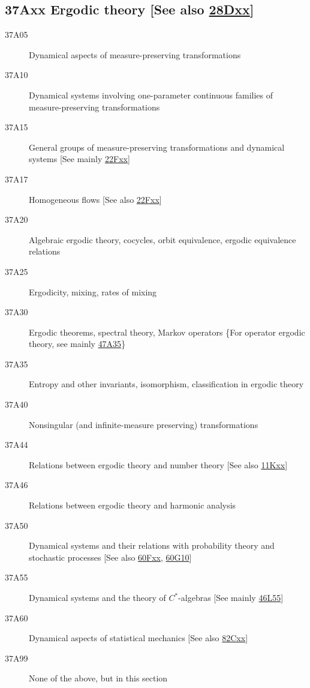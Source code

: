 \documentclass[letterpaper]{article}
\begin{document}
\subsection*{37Axx  Ergodic theory [See also \hyperref[28Dxx]{28Dxx}] }\label{37Axx}
\begin{description}  
\item [37A05]\label{37A05} Dynamical aspects of measure-preserving transformations 
\item [37A10]\label{37A10} Dynamical systems involving one-parameter continuous families of measure-preserving transformations
\item [37A15]\label{37A15} General groups of measure-preserving transformations and dynamical systems [See mainly \hyperref[22Fxx]{22Fxx}]
\item [37A17]\label{37A17} Homogeneous flows [See also \hyperref[22Fxx]{22Fxx}]
\item [37A20]\label{37A20} Algebraic ergodic theory, cocycles, orbit equivalence,  ergodic equivalence relations
\item [37A25]\label{37A25} Ergodicity, mixing, rates of mixing
\item [37A30]\label{37A30} Ergodic theorems, spectral theory, Markov operators \{For operator ergodic theory, see mainly \hyperref[47A35]{47A35}\}
\item [37A35]\label{37A35} Entropy and other invariants, isomorphism, classification in ergodic theory
\item [37A40]\label{37A40} Nonsingular (and infinite-measure preserving) transformations 
\item [37A44]\label{37A44} Relations between ergodic theory and number theory  [See also \hyperref[11Kxx]{11Kxx}]
\item [37A46]\label{37A46} Relations between ergodic theory and harmonic analysis 
\item [37A50]\label{37A50} Dynamical systems and their relations with probability theory and stochastic processes [See also \hyperref[60Fxx]{60Fxx}, \hyperref[60G10]{60G10}]
\item [37A55]\label{37A55}  Dynamical systems and  the theory of $C^*$-algebras [See mainly \hyperref[46L55]{46L55}]
\item [37A60]\label{37A60} Dynamical aspects of  statistical mechanics [See also \hyperref[82Cxx]{82Cxx}]
\item [37A99]\label{37A99} None of the above, but in this section
\end{description}
\end{document}
